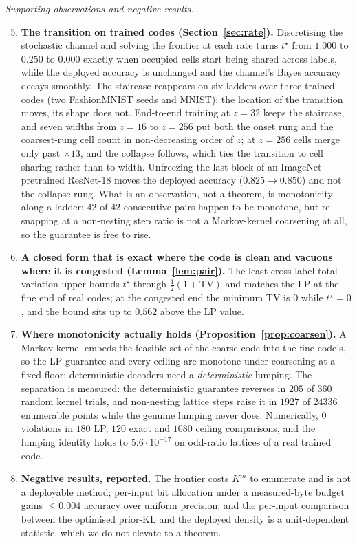 \documentclass[11pt]{article}
\begin{document}
\emph{Supporting observations and negative results.}
\begin{enumerate}\setcounter{enumi}{4}
\item \textbf{The transition on trained codes (Section~\ref{sec:rate}).} Discretising the
stochastic channel and solving the frontier at each rate turns $t^\star$ from $1.000$ to $0.250$
to $0.000$ exactly when occupied cells start being shared across labels, while the deployed
accuracy is unchanged and the channel's Bayes accuracy decays smoothly. The staircase reappears on
six ladders over three trained codes (two FashionMNIST seeds and MNIST): the location of the
transition moves, its shape does not. End-to-end training at $z=32$ keeps the staircase, and seven
widths from $z=16$ to $z=256$ put both the onset rung and the coarsest-rung cell count in
non-decreasing order of $z$; at $z=256$ cells merge only past $\times13$, and the collapse follows,
which ties the transition to cell sharing rather than to width. Unfreezing the last block of an ImageNet-pretrained ResNet-18
moves the deployed accuracy ($0.825\to0.850$) and not the collapse rung.
What is an observation, not a theorem, is monotonicity along a
ladder: $42$ of $42$ consecutive pairs happen to be monotone, but re-snapping at a non-nesting
step ratio is not a Markov-kernel coarsening at all, so the guarantee is free to rise.
\item \textbf{A closed form that is exact where the code is clean and vacuous where it is
congested (Lemma~\ref{lem:pair}).} The least cross-label total variation upper-bounds $t^\star$
through $\tfrac12(1+\mathrm{TV})$ and matches the LP at the fine end of real codes; at the
congested end the minimum TV is $0$ while $t^\star=0$, and the bound sits up to $0.562$ above the
LP value.
\item \textbf{Where monotonicity actually holds (Proposition~\ref{prop:coarsen}).} A Markov
kernel embeds the feasible set of the coarse code into the fine code's, so the LP guarantee and
every ceiling are monotone under coarsening at a fixed floor; deterministic decoders need a
\emph{deterministic} lumping. The separation is measured: the deterministic guarantee reverses in
$205$ of $360$ random kernel trials, and non-nesting lattice steps raise it in $1927$ of $24336$
enumerable points while the genuine lumping never does. Numerically, $0$ violations in $180$ LP,
$120$ exact and $1080$ ceiling comparisons, and the lumping identity holds to $5.6\cdot10^{-17}$ on
odd-ratio lattices of a real trained code.
\item \textbf{Negative results, reported.} The frontier costs $K^m$ to enumerate and is not a
deployable method; per-input bit allocation under a measured-byte budget gains $\le0.004$
accuracy over uniform precision; and the per-input comparison between the optimised prior-KL and
the deployed density is a unit-dependent statistic, which we do not elevate to a theorem.
\end{enumerate}
\end{document}
